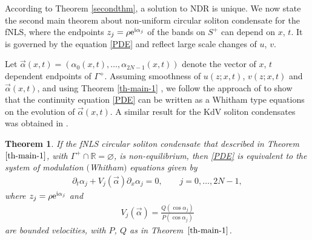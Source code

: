 \documentclass[pdftex]{sigma}
\numberwithin{equation}{section}
\newtheorem{Theorem}{Theorem}[section]
\newcommand{\G}{\Gamma}
\def\R{{\mathbb R}}
\def\a{\alpha}
\def\G{\Gamma}
\begin{document}
According to Theorem \ref{secondthm}, a solution to NDR is unique.
We now state the second main theorem about non-uniform circular soliton condensate for the fNLS,
where the endpoints ${z_j=\rho {\rm e}^{{\rm i}\a_j}}$ of the bands on $S^+$ can depend on $x$, $t$.
It is governed by the equation \eqref{PDE}
and reflect large scale changes of $u$, $v$.

Let $\vec \a(x,t)=(\a_0(x,t),\dots,\a_{2N-1}(x,t))$ denote the vector of $x$, $t$ dependent endpoints of $\G^+$. Assuming smoothness of $u(z;x,t)$, $v(z;x,t)$ and
$\vec \a(x,t)$, and using Theorem \ref{th-main-1} , we follow the approach of \cite{FFM} to show that
the continuity equation \eqref{PDE} can be written as a Whitham type equations on the evolution of $\vec \a(x,t)$. A similar result for the KdV soliton condensates was obtained in \cite{CERT}.


\begin{Theorem}\label{th-main-2}
If the fNLS circular soliton condensate that described in Theorem $\ref{th-main-1}$, with ${\G^+\cap\R=\varnothing}$, is non-equilibrium, then \eqref{PDE} is equivalent to the system of modulation $($Whitham$)$ equations
given by
\begin{gather}\label{Whit-alp}
\partial_t\a_j+V_j(\vec\a)\partial_x\a_j=0, \qquad j=0,\dots, 2N-1,
\end{gather}
where $z_j=\rho {\rm e}^{{\rm i}\a_j}$ and
\begin{gather}\label{mod-vel}
V_j(\vec\a)=\frac{Q(\cos\a_j)}{P(\cos\a_j)}
\end{gather}
are bounded velocities, with $P$, $Q$ as in Theorem~$\ref{th-main-1}$.
\end{Theorem}
\end{document}
